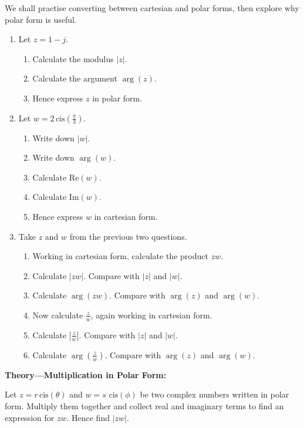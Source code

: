 \documentclass{article}
\newcommand{\cis}{\,\mathrm{cis}}
\begin{document}
\vspace{5mm}

We shall practise converting between cartesian and polar forms, then explore why polar form is useful.

\begin{enumerate}
\item Let $z=1-j$.
	\begin{enumerate}
	\item Calculate the modulus $|z|$.
	\item Calculate the argument $\arg(z)$.
	\item Hence express $z$ in polar form.
	\end{enumerate}
\item Let $w=2\cis\left(\frac{\pi}{3}\right)$.
	\begin{enumerate}
	\item Write down $|w|$.
	\item Write down $\arg(w)$.
	\item Calculate $\mathrm{Re}(w)$.
	\item Calculate $\mathrm{Im}(w)$.
	\item Hence express $w$ in cartesian form.
	\end{enumerate}
\item Take $z$ and $w$ from the previous two questions.
	\begin{enumerate}
	\item Working in cartesian form, calculate the product $zw$.
	\item Calculate $|zw|$. Compare with $|z|$ and $|w|$.
	\item Calculate $\arg(zw)$. Compare with $\arg(z)$ and $\arg(w)$.
	\item Now calculate $\frac{z}{w}$, again working in cartesian form.
	\item Calculate $\left|\frac{z}{w}\right|$. Compare with $|z|$ and $|w|$.
	\item Calculate $\arg\left(\frac{z}{w}\right)$. Compare with $\arg(z)$ and $\arg(w)$.
	\end{enumerate}
\end{enumerate}





\clearpage





\textbf{Theory---Multiplication in Polar Form:}\bigskip

Let $z=r\cis(\theta)$ and $w=s\,\cis(\phi)$ be two complex numbers written in polar form. Multiply them together and collect real and imaginary terms to find an expression for $zw$. Hence find $|zw|$.
\end{document}
